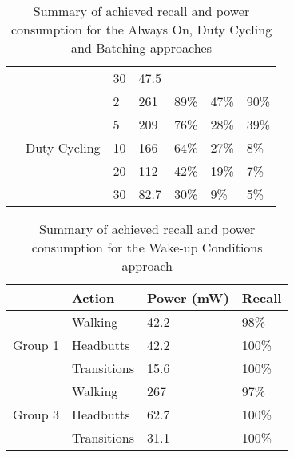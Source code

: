 \begin{table*}[t]
\begin{tabular}{|l|l|l|l|l|l|l|}
								& 								& 30		& 47.5		&						&							&							\\ \cline{2-7}
								& \multirow{5}{*}{Duty Cycling}	& 2			& 261		& 89\%					& 47\%						& 90\%						\\ \cline{3-7}
								& 								& 5			& 209		& 76\%					& 28\%						& 39\%						\\ \cline{3-7}
								& 								& 10		& 166		& 64\%					& 27\%						& 8\%						\\ \cline{3-7}
								& 								& 20		& 112		& 42\%					& 19\%						& 7\%						\\ \cline{3-7}
								& 								& 30		& 82.7		& 30\%					& 9\%						& 5\%						\\ \hline
    \end{tabular}
	\caption{Summary of achieved recall and power consumption for the Always On, Duty Cycling and Batching approaches}
	\label{table:summaryAA-DC-BATCHING}
\end{table*}

\begin{table}[t]
    \begin{tabular}{|l|l|l|l|}
	\hline
    ~       					& Action      & Power (mW) & Recall \\ \hline
    \multirow{3}{*}{Group 1} 	& Walking     & 42.2       & 98\%   \\ \cline{2-4}
								& Headbutts   & 42.2       & 100\%  \\ \cline{2-4}
								& Transitions & 15.6       & 100\%  \\ \hline
    \multirow{3}{*}{Group 3} 	& Walking     & 267        & 97\%   \\ \cline{2-4}
								& Headbutts   & 62.7       & 100\%  \\ \cline{2-4}
								& Transitions & 31.1       & 100\%  \\ \hline
    \end{tabular}
	\caption{Summary of achieved recall and power consumption for the Wake-up Conditions approach}
	\label{table:summaryWUC}
\end{table}

